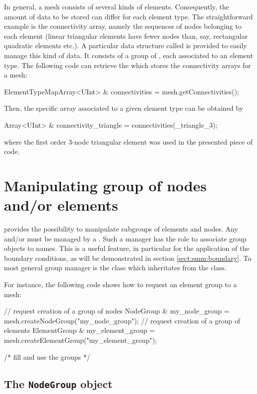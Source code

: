 In general, a mesh consists of several kinds of elements.
Consequently, the amount of data to be stored can differ for each
element type.  The straightforward example is the connectivity array,
namely the sequences of nodes belonging to each element (linear
triangular elements have fewer nodes than, say, rectangular quadratic
elements etc.).  A particular data structure called
 is provided to easily manage this kind of
data.  It consists of a group of , each associated to an
element type.  The following code can retrieve the
 which stores the connectivity arrays for a
mesh:
\begin{cpp}
  ElementTypeMapArray<UInt> & connectivities = mesh.getConnectivities();
\end{cpp}
Then, the specific array associated to a given element type can be obtained by
\begin{cpp}
  Array<UInt> & connectivity_triangle = connectivities(_triangle_3);
\end{cpp}
where the first order 3-node triangular element was used in the presented piece
of code.

\section{Manipulating group of nodes and/or elements}

\akantu provides the possibility to manipulate 
subgroups of elements and nodes.
Any  and/or  must be managed 
by a . Such a manager has the role to 
associate group objects to names. This is a useful feature, 
in particular for the application of the boundary conditions, 
as will be demonstrated in section \ref{sect:smm:boundary}.
To most general group manager is the  class 
which inheritates from the  class.

For instance, the following code shows how to request
an element group to a mesh:

\begin{cpp}
  // request creation of a group of nodes
  NodeGroup & my_node_group = mesh.createNodeGroup("my_node_group");
  // request creation of a group of elements
  ElementGroup & my_element_group = mesh.createElementGroup("my_element_group");

  /* fill and use the groups */
\end{cpp}


\subsection{The \texttt{NodeGroup} object}

